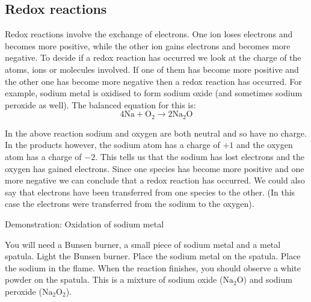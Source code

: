 {{            \subsection*{Redox reactions}
            \nopagebreak
            \label{m38719*eip-585}Redox reactions involve the exchange of electrons. One ion loses electrons and becomes more positive, while the other ion gains electrons and becomes more negative. To decide if a redox reaction has occurred we look at the charge of the atoms, ions or molecules involved. If one of them has become more positive and the other one has become more negative then a redox reaction has occurred. For example, sodium metal is oxidised to form sodium oxide (and sometimes sodium peroxide as well). The balanced equation for this is:
\label{m38719*id624}\nopagebreak\noindent{}
    \begin{equation*}
    4\text{Na}+{\text{O}}_{2}\to 2{\text{Na}}_{2}{\text{O}}
      \end{equation*}
\par \label{m38719*eip-815}In the above reaction sodium and oxygen are both neutral and so have no charge. In the products however, the sodium atom has a charge of $+1$ and the oxygen atom has a charge of $-2$. This tells us that the sodium has lost electrons and the oxygen has gained electrons. Since one species has become more positive and one more negative we can conclude that a redox reaction has occurred. We could also say that electrons have been transferred from one species to the other. (In this case the electrons were transferred from the sodium to the oxygen).\par \label{m38719*eip-878}
            \begin{g_experiment}{Demonstration: Oxidation of sodium metal}
            \nopagebreak
            \label{m38719*eip-355}
\begin{minipage}{.6\textwidth}
You will need a Bunsen burner, a small piece of sodium metal and a metal spatula. Light the Bunsen burner. Place the sodium metal on the spatula. Place the sodium in the flame. When the reaction finishes, you should observe a white powder on the spatula. This is a mixture of sodium oxide (${\text{Na}}_{2}\text{O}$) and sodium peroxide (${\text{Na}}_{2}{\text{O}}_{2}$). 
\par \label{m38719*eip-980}
\end{minipage}

\end{g_experiment}}}
